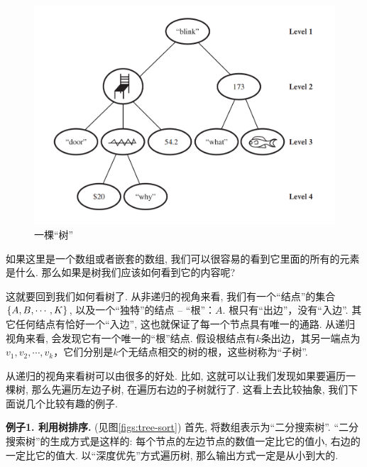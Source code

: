 \begin{figure}[h!]
	\centering
	\includegraphics[scale=0.5]{4-programs/figs/tree}
	\caption{一棵``树''}
	\label{figs:tree-fig}
	
\end{figure}

如果这里是一个数组或者嵌套的数组, 我们可以很容易的看到它里面的所有的元素是什么. 那么如果是树我们应该如何看到它的内容呢? 

这就要回到我们如何看树了. 从非递归的视角来看, 我们有一个“结点”的集合$\{A,B,\cdots,K\}$, 以及一个“独特”的结点 – “根”：$A$. 根只有“出边”，没有“入边”. 其它任何结点有恰好一个“入边”, 这也就保证了每一个节点具有唯一的通路.  从递归视角来看, 会发现它有一个唯一的“根”结点. 假设根结点有$k$条出边，其另一端点为 $v_1,v_2,\cdots,v_k$，它们分别是$k$个无结点相交的树的根，这些树称为“子树”. 

从递归的视角来看树可以由很多的好处. 比如, 这就可以让我们发现如果要遍历一棵树, 那么先遍历左边子树, 在遍历右边的子树就行了. 这看上去比较抽象, 我们下面说几个比较有趣的例子. 

\textbf{例子1. 利用树排序. }(见图\ref{figs:tree-sort}) 首先, 将数组表示为“二分搜索树”. ``二分搜索树''的生成方式是这样的: 每个节点的左边节点的数值一定比它的值小, 右边的一定比它的值大. 以“深度优先”方式遍历树, 那么输出方式一定是从小到大的. 


